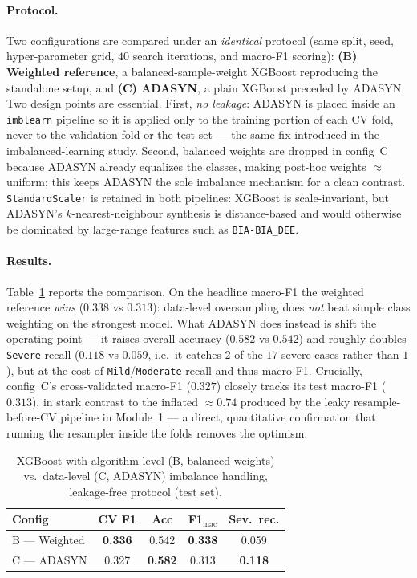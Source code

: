 \paragraph{Protocol.} Two configurations are compared under an \emph{identical} protocol (same split, seed, hyper-parameter grid, $40$ search iterations, and macro-F1 scoring): \textbf{(B) Weighted reference}, a balanced-sample-weight XGBoost reproducing the standalone setup, and \textbf{(C) ADASYN}, a plain XGBoost preceded by ADASYN. Two design points are essential. First, \emph{no leakage}: ADASYN is placed inside an \texttt{imblearn} pipeline so it is applied only to the training portion of each CV fold, never to the validation fold or the test set --- the same fix introduced in the imbalanced-learning study. Second, balanced weights are dropped in config~C because ADASYN already equalizes the classes, making post-hoc weights $\approx$ uniform; this keeps ADASYN the sole imbalance mechanism for a clean contrast. \texttt{StandardScaler} is retained in both pipelines: XGBoost is scale-invariant, but ADASYN's $k$-nearest-neighbour synthesis is distance-based and would otherwise be dominated by large-range features such as \texttt{BIA-BIA\_DEE}.

\paragraph{Results.} Table~\ref{tab:cmi_adasyn} reports the comparison. On the headline macro-F1 the weighted reference \emph{wins} ($0.338$ vs $0.313$): data-level oversampling does \emph{not} beat simple class weighting on the strongest model. What ADASYN does instead is shift the operating point --- it raises overall accuracy ($0.582$ vs $0.542$) and roughly doubles \texttt{Severe} recall ($0.118$ vs $0.059$, i.e.\ it catches $2$ of the $17$ severe cases rather than $1$), but at the cost of \texttt{Mild}/\texttt{Moderate} recall and thus macro-F1. Crucially, config~C's cross-validated macro-F1 ($0.327$) closely tracks its test macro-F1 ($0.313$), in stark contrast to the inflated $\approx 0.74$ produced by the leaky resample-before-CV pipeline in Module~1 --- a direct, quantitative confirmation that running the resampler inside the folds removes the optimism.

\begin{table}[H]
\centering
\small
\caption{XGBoost with algorithm-level (B, balanced weights) vs.\ data-level (C, ADASYN) imbalance handling, leakage-free protocol (test set).}
\label{tab:cmi_adasyn}
\begin{tabular}{l c c c c}
\hline
Config & CV F1 & Acc & F1$_{\text{mac}}$ & Sev.\ rec. \\
\hline
B --- Weighted & \textbf{0.336} & 0.542 & \textbf{0.338} & 0.059 \\
C --- ADASYN   & 0.327 & \textbf{0.582} & 0.313 & \textbf{0.118} \\
\hline
\end{tabular}
\end{table}

